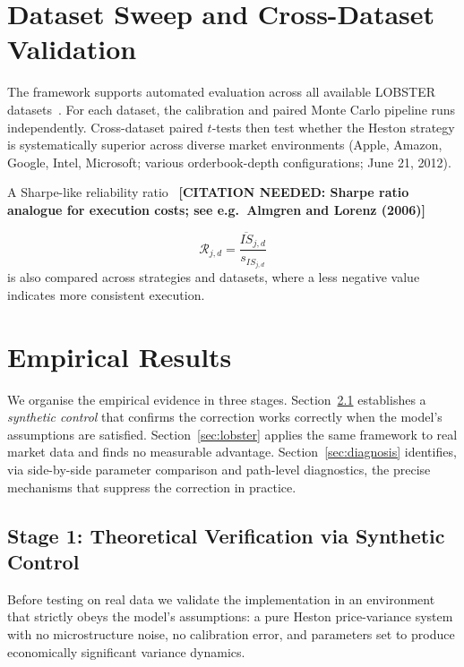 \documentclass[11pt]{article}
\newcommand{\needscite}[1]{%
  {\color{red}\textbf{[CITATION NEEDED: #1]}}%
}
\begin{document}
\section{Dataset Sweep and Cross-Dataset Validation}

The framework supports automated evaluation across all available LOBSTER
datasets~\cite{huang2011lobster}. For each dataset, the calibration and paired Monte Carlo
pipeline runs independently. Cross-dataset paired $t$-tests then test whether the Heston strategy
is systematically superior across diverse market environments (Apple, Amazon, Google, Intel,
Microsoft; various orderbook-depth configurations; June 21, 2012).

A Sharpe-like reliability ratio~\needscite{Sharpe ratio analogue for execution costs; see e.g.\ Almgren and Lorenz (2006)}
\[
\mathcal{R}_{j,d} = \frac{\overline{IS}_{j,d}}{s_{IS_{j,d}}}
\]
is also compared across strategies and datasets, where a less negative value indicates more
consistent execution.

\section{Empirical Results}

We organise the empirical evidence in three stages.
Section~\ref{sec:synthetic} establishes a \emph{synthetic control} that confirms the
correction works correctly when the model's assumptions are satisfied.
Section~\ref{sec:lobster} applies the same framework to real market data and finds no
measurable advantage.
Section~\ref{sec:diagnosis} identifies, via side-by-side parameter comparison and
path-level diagnostics, the precise mechanisms that suppress the correction in practice.

\subsection{Stage 1: Theoretical Verification via Synthetic Control}
\label{sec:synthetic}

Before testing on real data we validate the implementation in an environment that
strictly obeys the model's assumptions: a pure Heston price-variance system with
no microstructure noise, no calibration error, and parameters set to produce
economically significant variance dynamics.
\end{document}
